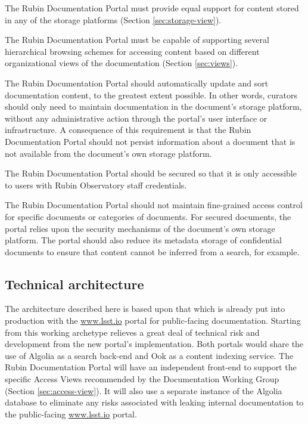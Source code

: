 The Rubin Documentation Portal must provide equal support for content stored in any of the storage platforms (Section \ref{sec:storage-view}).

The Rubin Documentation Portal must be capable of supporting several hierarchical browsing schemes for accessing content based on different organizational views of the documentation (Section \ref{sec:views}).

The Rubin Documentation Portal should automatically update and sort documentation content, to the greatest extent possible.
In other words, curators should only need to maintain documentation in the document's storage platform, without any administrative action through the portal's user interface or infrastructure.
A consequence of this requirement is that the Rubin Documentation Portal should not persist information about a document that is not available from the document's own storage platform.

The Rubin Documentation Portal should be secured so that it is only accessible to users with Rubin Observatory staff credentials.

The Rubin Documentation Portal should not maintain fine-grained access control for specific documents or categories of documents.
For secured documents, the portal relies upon the security mechanisms of the document's own storage platform.
The portal should also reduce its metadata storage of confidential documents to ensure that content cannot be inferred from a search, for example.

\subsection{Technical architecture}

The architecture described here is based upon that which is already put into production with the \url{www.lsst.io} portal for public-facing documentation.
Starting from this working archetype relieves a great deal of technical risk and development from the new portal's implementation.
Both portals would share the use of Algolia \citep{Algolia-cite} as a search back-end and Ook \citep{ook-cite} as a content indexing service.
The Rubin Documentation Portal will have an independent front-end to support the specific Access Views recommended by the Documentation Working Group (Section \ref{sec:access-view}).
It will also use a separate instance of the Algolia database to eliminate any risks associated with leaking internal documentation to the public-facing \url{www.lsst.io} portal.

